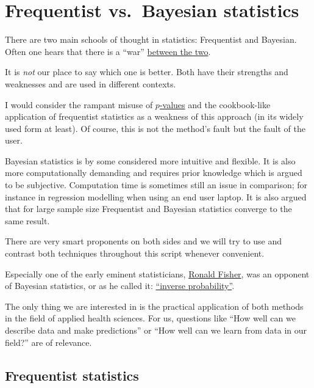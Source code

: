 \documentclass[
]{book}
\begin{document}
\section{Frequentist vs.~Bayesian statistics}\label{frequentist-vs.-bayesian-statistics}

There are two main schools of thought in statistics: Frequentist and Bayesian. Often one hears that there is a ``war'' \href{https://www.youtube.com/watch?v=8wVq5aGzSqY&t=22s&ab_channel=VeryNormal}{between the two}.

It is \emph{not} our place to say which one is better. Both have their strengths and weaknesses and are used in different contexts.

I would consider the rampant misuse of \href{https://www.sciencedirect.com/science/article/abs/pii/S0037196308000620?via\%3Dihub}{\(p\)-values} and the
cookbook-like application of frequentist statistics as a weakness of this approach (in its widely used form at least).
Of course, this is not the method's fault but the fault of the user.

Bayesian statistics is by some considered more intuitive and flexible. It is also more computationally demanding and requires prior knowledge which is argued to be subjective.
Computation time is sometimes still an issue in comparison; for instance in regression modelling when using an end user laptop.
It is also argued that for large sample size Frequentist and Bayesian statistics converge to the same result.

There are very smart proponents on both sides and we will try to use and contrast both techniques throughout this script whenever convenient.

Especially one of the early eminent statisticians, \href{https://en.wikipedia.org/wiki/Ronald_Fisher}{Ronald Fisher}, was an opponent of Bayesian statistics,
or as he called it: \href{https://errorstatistics.com/wp-content/uploads/2016/02/fisher-1930-inverse-probability.pdf}{``inverse probability''}.

The only thing we are interested in is the practical application of both methods in the field of applied health sciences.
For us, questions like ``How well can we describe data and make predictions'' or
``How well can we learn from data in our field?'' are of relevance.

\subsection{Frequentist statistics}\label{frequentist-statistics}
\end{document}

